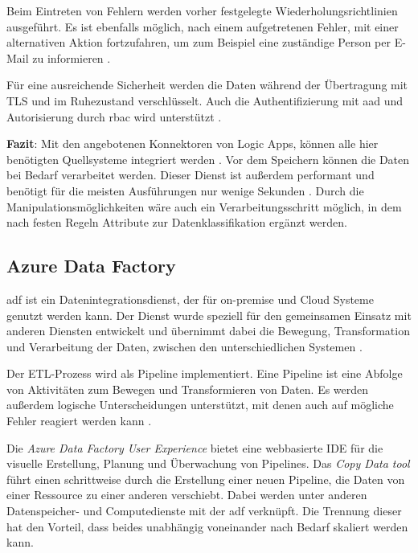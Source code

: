 Beim Eintreten von Fehlern werden vorher festgelegte Wiederholungsrichtlinien ausgeführt. Es ist ebenfalls möglich, nach einem aufgetretenen Fehler, mit einer alternativen Aktion fortzufahren, um zum Beispiel eine zuständige Person per E-Mail zu informieren \cite{fan_handle_2021}.

Für eine ausreichende Sicherheit werden die Daten während der Übertragung mit TLS und im Ruhezustand verschlüsselt. Auch die Authentifizierung mit \ac{aad} und Autorisierung durch \ac{rbac} wird unterstützt \cite{baldwin_azure_logicApps_2021}. 

\textbf{Fazit}: Mit den angebotenen Konnektoren von Logic Apps, können alle hier benötigten Quellsysteme integriert werden \cite[vgl.][]{fan_verwaltete_2021}. Vor dem Speichern können die Daten bei Bedarf verarbeitet werden. Dieser Dienst ist außerdem performant und benötigt für die meisten Ausführungen nur wenige Sekunden \cite{bennett_enterprise_2021}. Durch die Manipulationsmöglichkeiten wäre auch ein Verarbeitungsschritt möglich, in dem nach festen Regeln Attribute zur Datenklassifikation ergänzt werden.


\subsection{Azure Data Factory} \label{sec:grundlagen:azure_dienste:dataFactory}
\ac{adf} ist ein Datenintegrationsdienst, der für on-premise und Cloud Systeme genutzt werden kann. Der Dienst wurde speziell für den gemeinsamen Einsatz mit anderen Diensten entwickelt und übernimmt dabei die Bewegung, Transformation und Verarbeitung der Daten, zwischen den unterschiedlichen Systemen \cite{klein_iot_2017}.

Der ETL-Prozess wird als Pipeline implementiert. Eine Pipeline ist eine Abfolge von Aktivitäten zum Bewegen und Transformieren von Daten. Es werden außerdem logische Unterscheidungen unterstützt, mit denen auch auf mögliche Fehler reagiert werden kann \cite{zhu_pipeline_2021}.

Die \textit{Azure Data Factory User Experience} bietet eine webbasierte IDE für die visuelle Erstellung, Planung und Überwachung von Pipelines. Das \textit{Copy Data tool} führt einen schrittweise durch die Erstellung einer neuen Pipeline, die Daten von einer Ressource zu einer anderen verschiebt. Dabei werden unter anderen Datenspeicher- und Computedienste mit der \ac{adf} verknüpft. Die Trennung dieser hat den Vorteil, dass beides unabhängig voneinander nach Bedarf skaliert werden kann.

